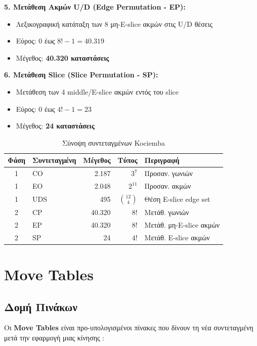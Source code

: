 \textbf{5. Μετάθεση Ακμών U/D (Edge Permutation - EP):}
\begin{itemize}
    \item Λεξικογραφική κατάταξη των 8 μη-E-slice ακμών στις U/D θέσεις
    \item Εύρος: $0$ έως $8! - 1 = 40.319$
    \item Μέγεθος: \textbf{40.320 καταστάσεις}
\end{itemize}

\textbf{6. Μετάθεση Slice (Slice Permutation - SP):}
\begin{itemize}
    \item Μετάθεση των 4 middle/E-slice ακμών εντός του slice
    \item Εύρος: $0$ έως $4! - 1 = 23$
    \item Μέγεθος: \textbf{24 καταστάσεις}
\end{itemize}

\begin{table}[h]
\centering
\caption{Σύνοψη συντεταγμένων Kociemba}
\label{tab:kociemba_coords}
\begin{tabular}{clrrl}
\toprule
\textbf{Φάση} & \textbf{Συντεταγμένη} & \textbf{Μέγεθος} & \textbf{Τύπος} & \textbf{Περιγραφή} \\
\midrule
1 & CO & 2.187 & $3^7$ & Προσαν. γωνιών \\
1 & EO & 2.048 & $2^{11}$ & Προσαν. ακμών \\
1 & UDS & 495 & $\binom{12}{4}$ & Θέση E-slice edge set \\
\midrule
2 & CP & 40.320 & $8!$ & Μετάθ. γωνιών \\
2 & EP & 40.320 & $8!$ & Μετάθ. μη-E-slice ακμών \\
2 & SP & 24 & $4!$ & Μετάθ. E-slice ακμών \\
\bottomrule
\end{tabular}
\end{table}


\section{Move Tables}
\label{sec:move_tables}

\subsection{Δομή Πινάκων}

Οι \textbf{Move Tables} είναι προ-υπολογισμένοι πίνακες που δίνουν τη νέα συντεταγμένη μετά την εφαρμογή μιας κίνησης \cite{kociemba_twophase_details}:


